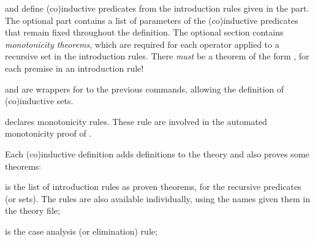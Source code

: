 \begin{isabellebody}
\begin{isamarkuptext}
\begin{description}
  \item \hyperlink{command.HOL.inductive}{\mbox{}} and \hyperlink{command.HOL.coinductive}{\mbox{}} define (co)inductive predicates from the
  introduction rules given in the \hyperlink{keyword.where}{\mbox{}} part.  The
  optional \hyperlink{keyword.for}{\mbox{}} part contains a list of parameters of the
  (co)inductive predicates that remain fixed throughout the
  definition.  The optional \hyperlink{keyword.monos}{\mbox{}} section contains
  \emph{monotonicity theorems}, which are required for each operator
  applied to a recursive set in the introduction rules.  There
  \emph{must} be a theorem of the form ,
  for each premise  in an introduction rule!

  \item \hyperlink{command.HOL.inductive-set}{\mbox{}} and \hyperlink{command.HOL.coinductive-set}{\mbox{}} are wrappers for to the previous commands,
  allowing the definition of (co)inductive sets.

  \item \hyperlink{attribute.HOL.mono}{\mbox{}} declares monotonicity rules.  These
  rule are involved in the automated monotonicity proof of \hyperlink{command.HOL.inductive}{\mbox{}}.

  \end{description}%
\end{isamarkuptext}%
\isamarkuptrue%
%
\isamarkuptrue%
%
\begin{isamarkuptext}%
Each (co)inductive definition  adds definitions to the
  theory and also proves some theorems:

  \begin{description}

  \item {} is the list of introduction rules as proven
  theorems, for the recursive predicates (or sets).  The rules are
  also available individually, using the names given them in the
  theory file;

  \item {} is the case analysis (or elimination) rule;


\end{description}
\end{isamarkuptext}
\end{isabellebody}
